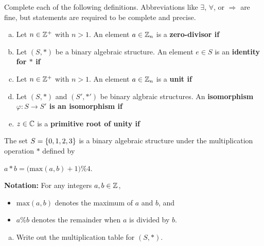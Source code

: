 \documentclass[11pt]{exam}
\begin{document}
\newpage %

%
%
%

\begin{questions}
\question[10] Complete each of the following definitions.  Abbreviations like $\exists$, $\forall$, or $\Rightarrow$ are fine, but statements are required to be complete and precise.
\begin{enumerate}[(a)]
\item Let $n\in\mathbb{Z}^{+}$ with $n > 1$.  An element $a\in \mathbb{Z}_{n}$ is a \bf zero-divisor \md if
\vfill

\item Let $(S,*)$ be a binary algebraic structure.  An element $e\in S$ is an \bf identity \md for $*$ if
\vfill

\item Let $n\in\mathbb{Z}^{+}$ with $n > 1$.  An element $a\in \mathbb{Z}_{n}$ is a \bf unit \md if
\vfill

\item Let $(S,*)$ and $(S',*')$ be binary algbraic structures.  An \bf isomorphism \md $\varphi:S\to S'$ is an isomorphism if
\vfill

\item $z\in\mathbb{C}$ is a \bf primitive root of unity \md if
\vfill

\end{enumerate}
\newpage


\question[5] The set $S = \left\{0,1,2,3\right\}$ is a binary algebraic structure under the multiplication operation $*$ defined by
\begin{center}
$a*b = \big(\text{max}(a,b) + 1\big)\% 4$.
\end{center}
\textbf{Notation:} For any integers $a,b\in\mathbb{Z}$,
\begin{itemize}
	\item $\text{max}(a,b)$ denotes the maximum of $a$ and $b$, and
	\item $a\% b$ denotes the remainder when $a$ is divided by $b$.
\end{itemize}
\begin{enumerate}[(a)]
\item Write out the multiplication table for $(S,*)$.
\vspace{8cm}


\end{enumerate}
\end{questions}
\end{document}
